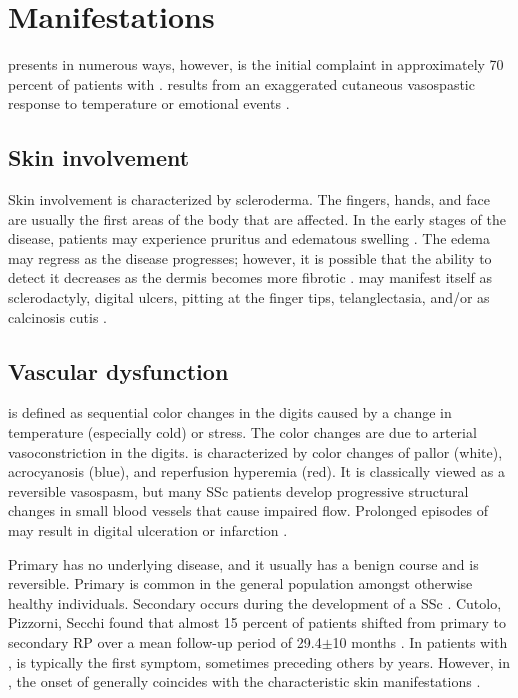 \section{Manifestations}
\label{manifestations}

\SSc presents in numerous ways, however, \Rp is the initial complaint in
approximately 70 percent of patients with \ssc \cite[1212]{kelley}. \Rp
results from an exaggerated cutaneous vasospastic response to temperature or
emotional events \citep{fonseca}.

\subsection{Skin involvement}

Skin involvement is characterized by scleroderma. The fingers, hands, and face
are usually the first areas of the body that are affected. In the early stages
of the disease, patients may experience pruritus and edematous swelling
\citep{overviewSSc}. The edema may regress as the disease progresses; however,
it is possible that the ability to detect it decreases as the dermis becomes
more fibrotic \citep[1213]{kelley}. \SSc may manifest itself as sclerodactyly,
digital ulcers, pitting at the finger tips, telanglectasia, and/or as
calcinosis cutis \citep{overviewSSc}.


\subsection{Vascular dysfunction}

\Rp is defined as sequential color changes in the digits caused by a change in
temperature (especially cold) or stress. The color changes are due to arterial
vasoconstriction in the digits. \Rp is characterized by color changes of
pallor (white), acrocyanosis (blue), and reperfusion hyperemia (red). It is
classically viewed as a reversible vasospasm, but many SSc patients develop
progressive structural changes in small blood vessels that cause impaired
flow. Prolonged episodes of \Rp may result in digital ulceration or infarction
\citep{overviewSSc}.

Primary \Rp has no underlying disease, and it usually has a benign course and
is reversible. Primary \Rp is common in the general population amongst
otherwise healthy individuals. Secondary \Rp occurs during the development of
a SSc \citep{overviewSSc}. Cutolo, Pizzorni, Secchi found that almost 15
percent of \Rp patients shifted from primary to secondary RP over a mean
follow-up period of 29.4$\pm$10 months \citep{cutulo}. In patients with
\lcSSc, \Rp is typically the first symptom, sometimes preceding others by
years. However, in \dcSSc, the onset of \Rp generally coincides with the
characteristic skin manifestations \citep{overviewSSc}.

